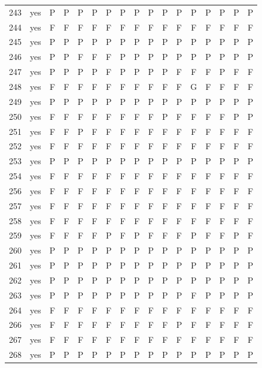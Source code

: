 \begin{table}[p]
\begin{tabular*}{\textwidth}{@{\extracolsep{\fill}}rcccccccccccccccc}
243 & yes & P & P & P & P & P & P & P & P & P & P & P & P & P & P & P\\
244 & yes & F & F & F & F & F & F & F & F & F & F & F & F & F & F & F\\
245 & yes & P & P & P & P & P & P & P & P & P & P & P & P & P & P & P\\
246 & yes & P & P & F & F & F & P & P & P & P & P & P & P & P & P & P\\
247 & yes & P & P & P & P & F & P & P & P & P & F & F & F & P & F & F\\
248 & yes & F & F & F & F & F & F & F & F & F & F & G & F & F & F & F\\
249 & yes & P & P & P & P & P & P & P & P & P & P & P & P & P & P & P\\
250 & yes & F & F & F & F & F & F & F & F & P & F & F & F & F & P & P\\
251 & yes & F & F & P & F & F & F & F & F & F & F & F & F & F & F & F\\
252 & yes & F & F & F & F & F & F & F & F & F & F & F & F & F & F & F\\
253 & yes & P & P & P & P & P & P & P & P & P & P & P & P & P & P & P\\
254 & yes & F & F & F & F & F & F & F & F & F & F & F & F & F & F & F\\
256 & yes & F & F & F & F & F & F & F & F & F & F & F & F & F & F & F\\
257 & yes & F & F & F & F & F & F & F & F & F & F & F & F & F & F & F\\
258 & yes & F & F & F & F & F & F & F & F & F & F & F & F & F & F & F\\
259 & yes & F & F & F & F & P & F & P & F & F & F & P & F & F & P & F\\
260 & yes & P & P & P & P & P & P & P & P & P & P & P & P & P & P & P\\
261 & yes & P & P & P & P & P & P & P & P & P & P & P & P & P & P & P\\
262 & yes & P & P & P & P & P & P & P & P & P & P & P & P & P & P & P\\
263 & yes & P & P & P & P & P & P & P & P & P & P & F & P & P & P & P\\
264 & yes & F & F & F & F & F & F & F & F & F & F & F & F & F & F & F\\
266 & yes & F & F & F & F & F & F & F & F & F & P & F & F & F & F & F\\
267 & yes & F & F & F & F & F & F & F & F & F & F & F & F & F & F & F\\
268 & yes & P & P & P & P & P & P & P & P & P & P & P & P & P & P & P\\
\bottomrule\end{tabular*}\end{table}
\clearpage

